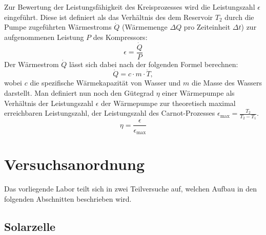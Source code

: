 \documentclass[english, ngerman]{scrartcl}
\begin{document}
Zur Bewertung der Leistungsfähigkeit des Kreisprozesses wird die Leistungszahl $\epsilon$ eingeführt. Diese ist definiert als das Verhältnis des dem Reservoir $T_2$ durch die Pumpe zugeführten Wärmestroms $\dot{Q}$ (Wärmemenge $\Delta Q$ pro Zeiteinheit $\Delta t$) zur aufgenommenen Leistung $P$ des Kompressors:
%
\begin{equation}
    \label{eq:leistungszahl}
    \epsilon = \frac{\dot{Q}}{P}
\end{equation}
%
Der Wärmestrom $\dot{Q}$ lässt sich dabei nach der folgenden Formel berechnen:
%
\begin{equation}
    \label{eq:waermestrom}
    \dot{Q} = c \cdot m \cdot \dot{T},
\end{equation}
%
wobei $c$ die spezifische Wärmekapazität von Wasser und $m$ die Masse des Wassers darstellt. Man definiert nun noch den Gütegrad $\eta$ einer Wärmepumpe als Verhältnis der Leistungszahl $\epsilon$ der Wärmepumpe zur theoretisch maximal erreichbaren Leistungszahl, der Leistungszahl des Carnot-Prozesses $\epsilon_{\text{max}} = \frac{T_2}{T_2-T_1}$.
%
\begin{equation}
    \label{eq:guetegrad}
    \eta = \frac{\epsilon}{\epsilon_{\text{max}}}
\end{equation}



\section{Versuchsanordnung}
\label{sec:versuchsanordnung}

Das vorliegende Labor teilt sich in zwei Teilversuche auf, welchen Aufbau in den folgenden Abschnitten beschrieben wird.

\subsection{Solarzelle}
\label{subsec:anordnung_solarzelle}
\end{document}
